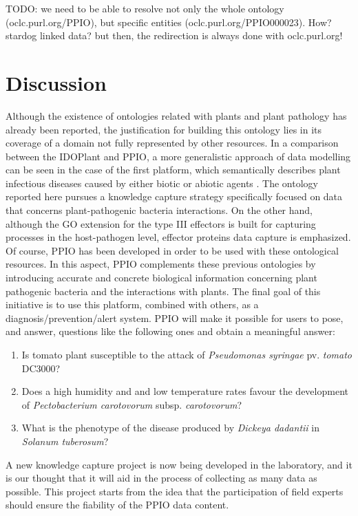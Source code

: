 \documentclass[sw]{iosart2c}
\begin{document}
TODO: we need to be able to resolve not only the whole ontology (oclc.purl.org/PPIO), but specific entities (oclc.purl.org/PPIO000023). How? stardog linked data? but then, the redirection is always done with oclc.purl.org!



\section{Discussion}

Although the existence of ontologies related with plants and plant pathology has already been reported, the justification for building this ontology lies in its coverage of a domain not fully represented by other resources. In a comparison between the IDOPlant and PPIO, a more generalistic approach of data modelling can be seen in the case of the first platform, which semantically describes plant infectious diseases caused by either biotic or abiotic agents . The ontology reported here pursues a knowledge capture strategy specifically focused on data that concerns plant-pathogenic bacteria interactions. On the other hand, although the GO extension for the type III effectors is built for capturing processes in the host-pathogen level, effector proteins data capture is emphasized. Of course, PPIO has been developed in order to be used with these ontological resources. In this aspect, PPIO complements these previous ontologies by introducing accurate and concrete biological information concerning plant pathogenic bacteria and the interactions with plants. The final goal of this initiative is to use this platform, combined with others, as a diagnosis/prevention/alert system. PPIO will make it possible for users to pose, and answer, questions like the following ones and obtain a meaningful answer:

\begin{enumerate}
\item Is tomato plant susceptible to the attack of {\itshape Pseudomonas syringae} pv. {\itshape tomato} DC3000?
\item Does a high humidity and and low temperature rates favour the development of {\itshape Pectobacterium carotovorum} subsp. {\itshape carotovorum}?
\item What is the phenotype of the disease produced by {\itshape Dickeya dadantii} in {\itshape Solanum tuberosum}?

\end{enumerate}

A new knowledge capture project is now being developed in the laboratory, and it is our thought that it will aid in the process of collecting as many data as possible. This project starts from the idea that the participation of field experts should ensure the fiability of the PPIO data content.
\end{document}
